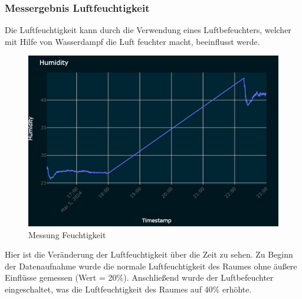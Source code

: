 \subsubsection{Messergebnis Luftfeuchtigkeit}
Die Luftfeuchtigkeit kann durch die Verwendung eines Luftbefeuchters, welcher mit Hilfe von Wasserdampf die Luft feuchter macht, beeinflusst werde.\\
\vspace{3mm}
\begin{figure}[H]
	\centering
	\includegraphics[scale=1]{image/feuchtigkeit.png}
	\caption{Messung Feuchtigkeit}
	\label{fig:enter-label}
\end{figure}
\vspace{3mm}
Hier ist die Veränderung der Luftfeuchtigkeit über die Zeit zu sehen. Zu Beginn der Datenaufnahme wurde die normale Luftfeuchtigkeit des Raumes ohne äußere Einflüsse gemessen (Wert = 20\%). Anschließend wurde der Luftbefeuchter eingeschaltet, was die Luftfeuchtigkeit des Raumes auf 40\% erhöhte.

